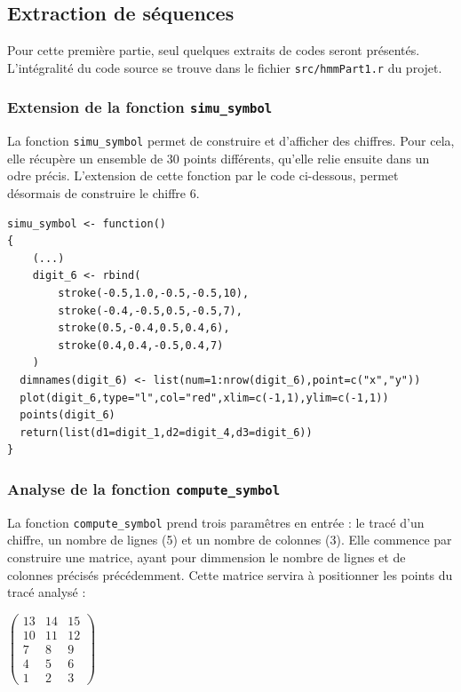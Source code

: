 \subsection{Extraction de séquences}

Pour cette première partie, seul quelques extraits de codes seront présentés. L'intégralité du code source se trouve dans le fichier \texttt{src/hmmPart1.r} du projet. 

\subsubsection*{Extension de la fonction \texttt{simu\_symbol}}

La fonction \texttt{simu\_symbol} permet de construire et d'afficher des chiffres. Pour cela, elle récupère un ensemble de 30 points différents, qu'elle relie ensuite dans un odre précis. L'extension de cette fonction par le code ci-dessous, permet désormais de construire le chiffre 6.

\begin{lstlisting}
simu_symbol <- function()
{
	(...)
	digit_6 <- rbind(
		stroke(-0.5,1.0,-0.5,-0.5,10),
		stroke(-0.4,-0.5,0.5,-0.5,7),
		stroke(0.5,-0.4,0.5,0.4,6),
		stroke(0.4,0.4,-0.5,0.4,7)
	)
  dimnames(digit_6) <- list(num=1:nrow(digit_6),point=c("x","y"))
  plot(digit_6,type="l",col="red",xlim=c(-1,1),ylim=c(-1,1))
  points(digit_6)
  return(list(d1=digit_1,d2=digit_4,d3=digit_6))
}
\end{lstlisting}

\subsubsection*{Analyse de la fonction \texttt{compute\_symbol}}
La fonction \texttt{compute\_symbol} prend trois paramêtres en entrée : le tracé d'un chiffre, un nombre de lignes (5) et un nombre de colonnes (3). Elle commence par construire une matrice, ayant pour dimmension le nombre de lignes et de colonnes précisés précédemment. Cette matrice servira à positionner les points du tracé analysé :
\begin{center}
	$\begin{pmatrix}
		13 & 14 & 15 \\
		10 & 11 & 12 \\
		7 & 8 & 9 \\
		4 & 5 & 6 \\
		1 & 2 & 3
	\end{pmatrix}$
\end{center}

